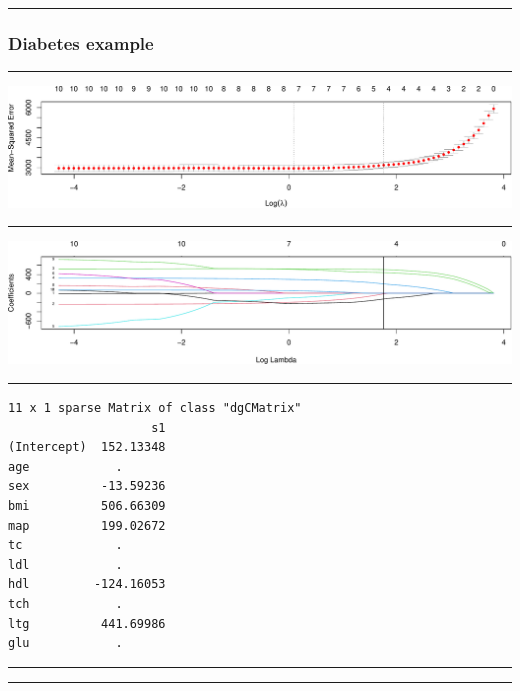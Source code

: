 \documentclass[
  letterpaper,
  DIV=11,
  numbers=noendperiod]{scrartcl}
\begin{document}
\begin{center}\rule{0.5\linewidth}{0.5pt}\end{center}

\hypertarget{diabetes-example}{%
\subsubsection{Diabetes example}\label{diabetes-example}}

\begin{center}\rule{0.5\linewidth}{0.5pt}\end{center}

\includegraphics{W6_files/figure-pdf/unnamed-chunk-18-1.pdf}

\begin{center}\rule{0.5\linewidth}{0.5pt}\end{center}

\includegraphics{W6_files/figure-pdf/unnamed-chunk-19-1.pdf}

\begin{center}\rule{0.5\linewidth}{0.5pt}\end{center}

\begin{verbatim}
11 x 1 sparse Matrix of class "dgCMatrix"
                    s1
(Intercept)  152.13348
age            .      
sex          -13.59236
bmi          506.66309
map          199.02672
tc             .      
ldl            .      
hdl         -124.16053
tch            .      
ltg          441.69986
glu            .      
\end{verbatim}

\begin{center}\rule{0.5\linewidth}{0.5pt}\end{center}

\begin{center}\rule{0.5\linewidth}{0.5pt}\end{center}
\end{document}
